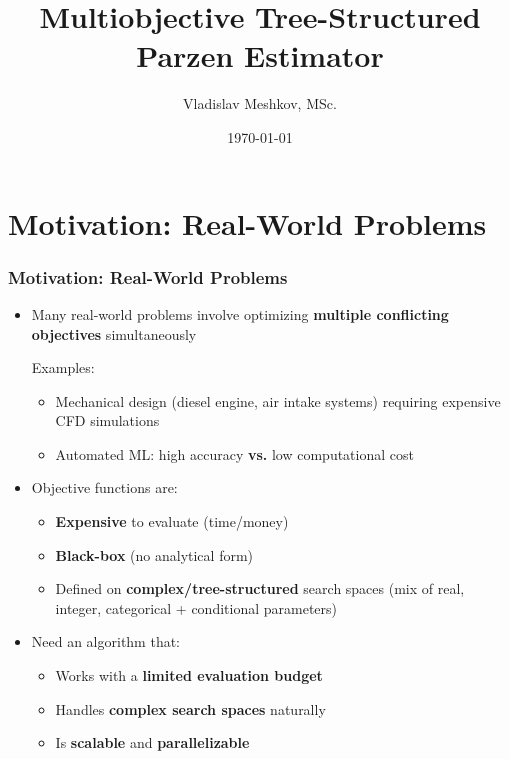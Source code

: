 \documentclass[aspectratio=169, 12pt]{beamer}
\title{Multiobjective Tree-Structured Parzen Estimator}
\author[V.\,M.~Meshkov]{Vladislav Meshkov, MSc.}
\institute{Moscow Institute of Physics and Technology}
\date{\today}
\begin{document}
\maketitle

\section{Motivation: Real-World Problems}
\begin{frame}
\frametitle{Motivation: Real-World Problems}
\begin{itemize}
\item Many real-world problems involve optimizing \textbf{multiple conflicting objectives} simultaneously
    
    Examples: 
    \begin{itemize}
        \item Mechanical design (diesel engine, air intake systems) requiring expensive CFD simulations
        \item Automated ML: high accuracy \textbf{vs.} low computational cost
    \end{itemize}

\item Objective functions are:
    \begin{itemize}
        \item \textbf{Expensive} to evaluate (time/money)
        \item \textbf{Black-box} (no analytical form)
        \item Defined on \textbf{complex/tree-structured} search spaces (mix of real, integer, categorical + conditional parameters)
    \end{itemize}

\item Need an algorithm that:
    \begin{itemize}
        \item Works with a \textbf{limited evaluation budget}
        \item Handles \textbf{complex search spaces} naturally
        \item Is \textbf{scalable} and \textbf{parallelizable}
    \end{itemize}
\end{itemize}
\end{frame}
\end{document}
